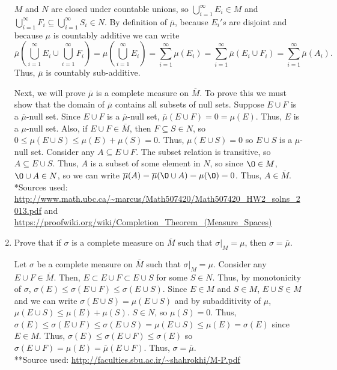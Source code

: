 \begin{enumerate}
\begin{pf}
\[\]
$M$ and $N$ are closed under countable unions, so $\bigcup_{i=1}^\infty E_i \in M$ and $ \bigcup_{i=1}^\infty F_i \subseteq \bigcup_{i=1}^\infty S_i \in N$. By definition of $\overline{\mu}$, because $E_i's $ are disjoint and because $\mu$ is countably additive we can write 
\[
\overline{\mu}\left(\bigcup_{i=1}^\infty E_i \cup \bigcup_{i=1}^\infty F_i \right) = {\mu}\left(\bigcup_{i=1}^\infty E_i \right) = \sum_{i=1}^\infty\mu(E_i)= \sum_{i=1}^\infty\overline{\mu}(E_i \cup F_i) =\sum_{i=1}^\infty\overline{\mu}(A_i).\]
Thus, $\overline{\mu}$ is countably sub-additive. 
\end{pf}
\begin{pf}
Next, we will prove $\overline{\mu}$ is a complete measure on $\overline{M}$. To prove this we must show that the domain of $\overline{\mu}$ contains all subsets of null sets. Suppose $E \cup F$ is a $\overline{\mu}$-null set.  Since $E \cup F$ is a $\overline{\mu}$-null set, $\overline{\mu}(E \cup F) = 0 = \mu(E)$. Thus, $E$ is a $\mu$-null set. Also, if $E \cup F \in \overline{M}$, then $F \subseteq S \in N$, so $0 \leq \mu(E \cup S) \leq \mu(E) + \mu(S) = 0$. Thus, $\mu(E \cup S) = 0$ so $E \cup S$ is a $\mu$-null set. Consider any $A \subseteq E \cup F$. The subset relation is transitive, so $A \subseteq E \cup S$. Thus, $A$ is a subset of some element in $N$, so since $\O \in M$, $\O \cup A \in N$, so we can write $\overline{\mu}(A)=\overline{\mu}(\O \cup A)= \mu(\O)=0$. Thus, $A \in \overline{M}$. \\
\noindent **Sources used: \url{http://www.math.ubc.ca/~marcus/Math507420/Math507420_HW2_solns_2013.pdf} and \url{https://proofwiki.org/wiki/Completion_Theorem_(Measure_Spaces)}
\end{pf}


\item Prove that if $\sigma$ is a complete measure on $\overline{M}$ such that $\sigma |_M=\mu$, then $\sigma = \overline{\mu}$. 
\begin{pf}
Let $\sigma$ be a complete measure on $\overline{M}$ such that $\sigma |_M=\mu$. Consider any $E \cup F \in \overline{M}$. Then, $E \subset E \cup F \subset E \cup S$ for some $S \in N$. Thus, by monotonicity of $\sigma$, 
$\sigma(E) \leq \sigma(E \cup F) \leq \sigma(E \cup S)$. Since $E \in M$ and $S \in M$, $E \cup S \in M$ and we can write $\sigma(E \cup S)= \mu(E \cup S)$ and by subadditivity of $\mu$, $\mu(E \cup S)\leq \mu(E) + \mu(S)$. $S \in N$, so $\mu(S)=0$. Thus, $\sigma(E) \leq \sigma(E \cup F) \leq \sigma(E \cup S) = \mu(E \cup S) \leq \mu(E)=\sigma(E)$ since $E \in M$. Thus, $\sigma(E) \leq \sigma(E \cup F) \leq \sigma(E)$ so $\sigma(E \cup F)= \mu(E)=\overline{\mu}(E \cup F)$. Thus, $\sigma = \overline{\mu}$.\\
**Source used: \url{ http://faculties.sbu.ac.ir/~shahrokhi/M-P.pdf }
\end{pf}
\end{enumerate}
